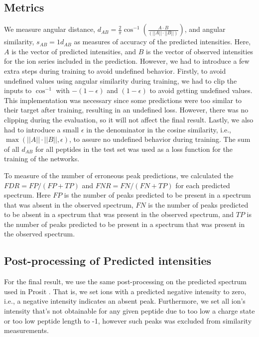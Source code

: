 \documentclass[10pt,a4paper]{article}
\begin{document}
\subsection*{Metrics}

We measure angular distance, $d_{AB}=\frac{2}{\pi} \cos^{-1}\left(\frac{A \cdot B}{(||A||\cdot||B||)}\right)$, and angular similarity, $s_{AB} = 1 d_{AB}$ as measures of accuracy of the predicted intensities. Here, $A$ is the vector of predicted intensities, and $B$ is the vector of observed intensities for the ion series included in the prediction. However, we had to introduce a few extra steps during training to avoid undefined behavior. Firstly, to avoid undefined values using angular similarity during training, we had to clip the inputs to $\cos^{-1}$ with $-(1-\epsilon)$ and $(1-\epsilon)$ to avoid getting undefined values. This implementation was necessary since some predictions were too similar to their target after training, resulting in an undefined loss. However, there was no clipping during the evaluation, so it will not affect the final result. Lastly, we also had to introduce a small $\epsilon$ in the denominator in the cosine similarity, i.e., $\max(||A||\cdot||B||, \epsilon)$, to assure no undefined behavior during training. The sum of all $d_{AB}$ for all peptides in the test set was used as a loss function for the training of the networks. 

To measure of the number of erroneous peak predictions, we calculated the $\mathit{FDR}=\mathit{FP}/(\mathit{FP}+\mathit{TP})$ and $\mathit{FNR}=\mathit{FN}/(\mathit{FN}+\mathit{TP})$ for each predicted spectrum. Here $\mathit{FP}$ is the number of peaks predicted to be present in a spectrum that was absent in the observed spectrum, $\mathit{FN}$ is the number of peaks predicted to be absent in a spectrum that was present in the observed spectrum, and $\mathit{TP}$ is the number of peaks predicted to be present in a spectrum that was present in the observed spectrum.

\subsection*{Post-processing of Predicted intensities}
For the final result, we use the same post-processing on the predicted spectrum used in Prosit ​\cite{Gessulat2019-el}. That is, we set ions with a predicted negative intensity to zero, i.e., a negative intensity indicates an absent peak. Furthermore, we set all ion's intensity that's not obtainable for any given peptide due to too low a charge state or too low peptide length to -1, however such peaks was excluded from similarity measurements.
\end{document}
